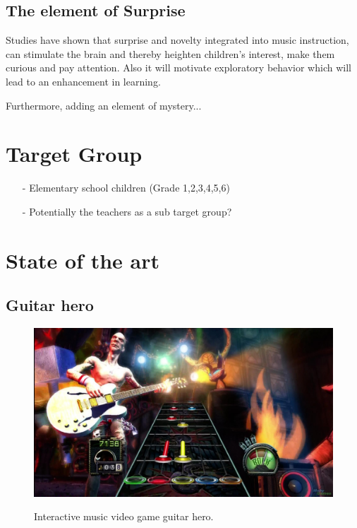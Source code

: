\subsection{The element of Surprise}
Studies have shown that surprise and novelty integrated into music instruction, can stimulate the brain and thereby heighten children's interest, make them curious and pay attention\cite{bagpipesSurprise}. Also it will motivate exploratory behavior which will lead to an enhancement in learning.



Furthermore, adding an element of mystery...

\section{Target Group}

\begin{itemize}
	\item[-] Elementary school children (Grade 1,2,3,4,5,6)
	\item[-] Potentially the teachers as a sub target group?
\end{itemize}





\section{State of the art}\label{sec:sota}
	
	\subsection{Guitar hero}\label{sec:guitarHero}
		\begin{figure}[H]
			\centering
			\includegraphics[width=0.7\linewidth]{figure/Analysis/guitarhero}
			\label{fig:guitarHero}
			\caption{Interactive music video game guitar hero.}
		\end{figure}

